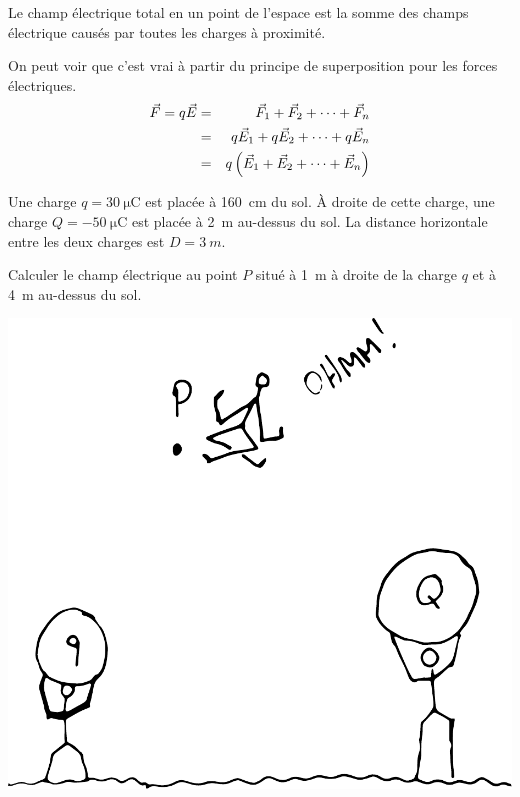 \begin{fondamentalbox}

Le champ électrique total en un point de l'espace est la somme des champs
électrique causés par toutes les charges à proximité.
\end{fondamentalbox}

On peut voir que c'est vrai à partir du principe de superposition pour les
forces électriques.
\begin{eqnarray*}
  \vec{F} = q\vec{E} &=& \vec{F}_1 + \vec{F}_2 + \cdots + \vec{F}_n \\
        &=& q \vec{E}_1 + q \vec{E}_2 + \cdots + q \vec{E}_n \\
        &=& q \left( \vec{E}_1 + \vec{E}_2 + \cdots + \vec{E}_n \right)
\end{eqnarray*}



\begin{diapobox}
  Une charge $q = \SI{30}{\micro\coulomb}$ est placée à \SI{160}{cm} du sol. À
  droite de cette charge, une charge $Q = \SI{-50}{\micro\coulomb}$ est placée
  à \SI{2}{m} au-dessus du sol. La distance horizontale entre les deux charges
  est $D = \SI{3}{m}$.

  Calculer le champ électrique au point $P$ situé à \SI{1}{m} à droite de la
  charge $q$ et à \SI{4}{m} au-dessus du sol.

  \begin{center}
    \includegraphics[scale=0.25]{02-champ-electrique/figures/champ-deux-charges-1.pdf}
  \end{center}
\end{diapobox}

